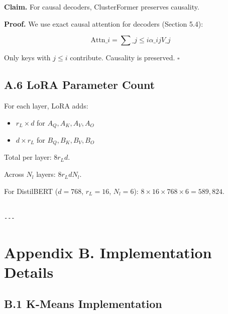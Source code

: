 \textbf{Claim.} For causal decoders, ClusterFormer preserves causality.

\textbf{Proof.} We use exact causal attention for decoders (Section 5.4):

\[
\text{Attn}\_i = \sum\_{j \leq i} \alpha\_{ij} V\_j
\]

Only keys with $j \leq i$ contribute. Causality is preserved. $\square$

\subsection{A.6 LoRA Parameter Count}

For each layer, LoRA adds:
\begin{itemize}
\item $r_L \times d$ for $A_Q, A_K, A_V, A_O$
\item $d \times r_L$ for $B_Q, B_K, B_V, B_O$

\end{itemize}
Total per layer: $8 r_L d$.

Across $N_l$ layers: $8 r_L d N_l$.

For DistilBERT ($d=768$, $r_L=16$, $N_l=6$): $8 \times 16 \times 768 \times 6 = 589{,}824$.
\begin{lstlisting}

---
\end{lstlisting}

\section{Appendix B. Implementation Details}

\subsection{B.1 K-Means Implementation}

